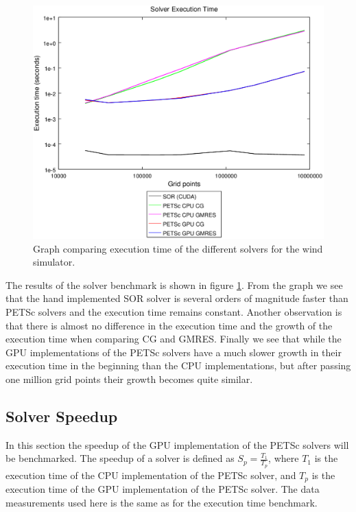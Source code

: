 \begin{figure}[ht]
	\center
	\includegraphics[width=1.0\textwidth]{results/data/sb/exec_time_all}
	\caption{Graph comparing execution time of the different solvers for the
		wind simulator.}
	\label{fig:sb_exec_time_all}
\end{figure}

The results of the solver benchmark is shown in figure \ref{fig:sb_exec_time_all}.
From the graph we see that the hand implemented SOR solver is several orders of
magnitude faster than PETSc solvers and the execution time remains constant.
Another observation is that there is almost no difference in the execution time
and the growth of the execution time when comparing CG and GMRES. Finally we see
that while the GPU implementations of the PETSc solvers have a much slower growth
in their execution time in the beginning than the CPU implementations, but after
passing one million grid points their growth becomes quite similar.

\subsection{Solver Speedup}

In this section the speedup of the GPU implementation of the PETSc solvers will
be benchmarked. The speedup of a solver is defined as $S_p = \frac{T_1}{T_p}$,
where $T_1$ is the execution time of the CPU implementation of the PETSc solver,
and $T_p$ is the execution time of the GPU implementation of the PETSc solver.
The data measurements used here is the same as for the execution time benchmark.

